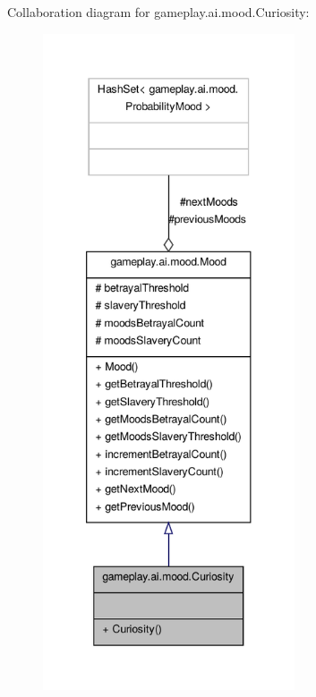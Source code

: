 Collaboration diagram for gameplay.\-ai.\-mood.\-Curiosity\-:
\nopagebreak
\begin{figure}[H]
\begin{center}
\leavevmode
\includegraphics[height=550pt]{classgameplay_1_1ai_1_1mood_1_1_curiosity__coll__graph}
\end{center}
\end{figure}
